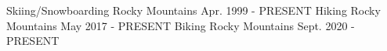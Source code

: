 

\begin{cventries}

  \cventry
    {} %
    {Skiing/Snowboarding} %
    {Rocky Mountains} %
    {Apr. 1999 - PRESENT} %
    {} %
    {} %
  \cventry
    {} %
    {Hiking} %
    {Rocky Mountains} %
    {May 2017 - PRESENT} %
    {} %
    {} %
  \cventry
    {} %
    {Biking} %
    {Rocky Mountains} %
    {Sept. 2020 - PRESENT} %
    {} %
    {} %
\end{cventries}
